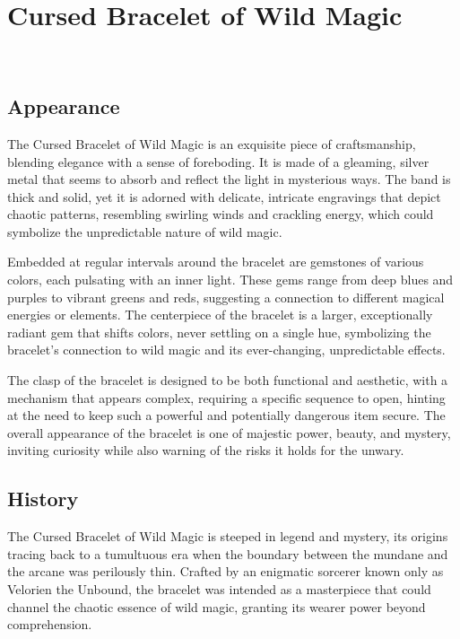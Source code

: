 
\chapter*{Cursed Bracelet of Wild Magic}
\\

\section*{Appearance}
The Cursed Bracelet of Wild Magic is an exquisite piece of craftsmanship, blending elegance with a sense of foreboding. It is made of a gleaming, silver metal that seems to absorb and reflect the light in mysterious ways. The band is thick and solid, yet it is adorned with delicate, intricate engravings that depict chaotic patterns, resembling swirling winds and crackling energy, which could symbolize the unpredictable nature of wild magic.

Embedded at regular intervals around the bracelet are gemstones of various colors, each pulsating with an inner light. These gems range from deep blues and purples to vibrant greens and reds, suggesting a connection to different magical energies or elements. The centerpiece of the bracelet is a larger, exceptionally radiant gem that shifts colors, never settling on a single hue, symbolizing the bracelet's connection to wild magic and its ever-changing, unpredictable effects.

The clasp of the bracelet is designed to be both functional and aesthetic, with a mechanism that appears complex, requiring a specific sequence to open, hinting at the need to keep such a powerful and potentially dangerous item secure. The overall appearance of the bracelet is one of majestic power, beauty, and mystery, inviting curiosity while also warning of the risks it holds for the unwary.

\section*{History}
The Cursed Bracelet of Wild Magic is steeped in legend and mystery, its origins tracing back to a tumultuous era when the boundary between the mundane and the arcane was perilously thin. Crafted by an enigmatic sorcerer known only as Velorien the Unbound, the bracelet was intended as a masterpiece that could channel the chaotic essence of wild magic, granting its wearer power beyond comprehension.

